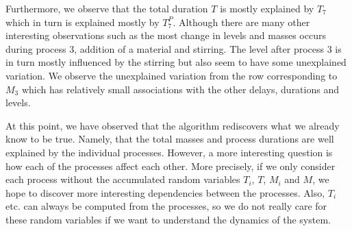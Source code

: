 \documentclass[../Thesis.tex]{subfiles}
\begin{document}
Furthermore, we observe that the total duration $T$ is mostly explained by $T_7$ which in turn is explained mostly by $T^P_7$. Although there are many other interesting observations such as the most change in levels and masses occurs during process $3$, addition of a material and stirring. The level after process $3$ is in turn mostly influenced by the stirring but also seem to have some unexplained variation. We observe the unexplained variation from the row corresponding to $M_3$ which has relatively small associations with the other delays, durations and levels.

At this point, we have observed that the algorithm rediscovers what we already know to be true. Namely, that the total masses and process durations are well explained by the individual processes. However, a more interesting question is how each of the processes affect each other. More precisely, if we only consider each process without the accumulated random variables $T_i$, $T$, $M_i$ and $M$, we hope to discover more interesting dependencies between the processes. Also, $T_i$ etc. can always be computed from the processes, so we do not really care for these random variables if we want to understand the dynamics of the system.
\end{document}

